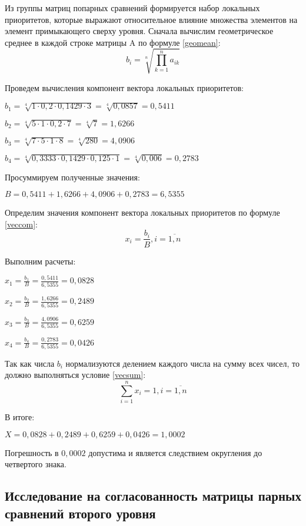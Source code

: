 Из группы матриц попарных сравнений формируется набор локальных приоритетов, которые выражают относительное влияние множества элементов на элемент примыкающего сверху уровня.
Сначала вычислим геометрическое среднее в каждой строке матрицы A по формуле \ref{geomean}:
\begin{equation}\label{geomean}
b_i = \sqrt[n]{\prod_{k=1}^{n}a_{ik}}
\end{equation}

Проведем вычисления компонент вектора локальных приоритетов:

$b_1 = \sqrt[4]{1 \cdot 0,2 \cdot 0,1429 \cdot 3} = \sqrt[4]{0,0857} = 0,5411$

$b_2 = \sqrt[4]{5 \cdot 1 \cdot 0,2 \cdot 7} = \sqrt[4]{7} = 1,6266$

$b_3 = \sqrt[4]{7 \cdot 5 \cdot 1 \cdot 8} = \sqrt[4]{280} = 4,0906$

$b_4 = \sqrt[4]{0,3333 \cdot 0,1429 \cdot 0,125 \cdot 1} = \sqrt[4]{0,006} = 0,2783$

Просуммируем полученные значения:

$B = 0,5411 + 1,6266 + 4,0906 + 0,2783 = 6,5355$

Определим значения компонент вектора локальных приоритетов по формуле \ref{veccom}:
\begin{equation}\label{veccom}
x_i = \frac{b_i}{B}, i = \overline{1,n}
\end{equation}

Выполним расчеты:

$x_1 = \frac{b_1}{B} =\frac{0,5411}{6,5355} = 0,0828$

$x_2 = \frac{b_2}{B} =\frac{1,6266}{6,5355} = 0,2489$

$x_3 = \frac{b_3}{B} =\frac{4,0906}{6,5355} = 0,6259$

$x_4 = \frac{b_4}{B} =\frac{0,2783}{6,5355} = 0,0426$

Так как числа $b_i$ нормализуются делением каждого числа на сумму всех чисел, то должно выполняться условие 
\ref{vecsum}:
\begin{equation}\label{vecsum}
\sum_{i=1}^{n} x_i = 1, i = \overline{1,n}
\end{equation}

В итоге:

$X = 0,0828 + 0,2489 + 0,6259 + 0,0426 = 1,0002$

Погрешность в $0,0002$ допустима и является следствием округления до четвертого знака.

\subsection{Исследование на согласованность матрицы парных сравнений второго уровня}

